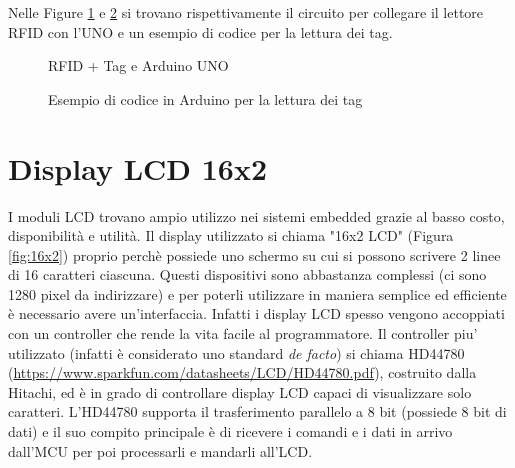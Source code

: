 \documentclass[12pt]{report}
\begin{document}
Nelle Figure \ref{fig:rfid_uno} e \ref{fig:rfid_code} si trovano rispettivamente il circuito per collegare il lettore RFID con l'UNO e un esempio di codice per la lettura dei tag.

\begin{figure}
	\caption{RFID + Tag e Arduino UNO}
	\label{fig:rfid_uno}
\end{figure}

\begin{figure}
	\caption{Esempio di codice in Arduino per la lettura dei tag}
	\label{fig:rfid_code}
\end{figure}

%
\section{Display LCD 16x2}
%

I moduli LCD trovano ampio utilizzo nei sistemi embedded grazie al basso costo, disponibilità e utilità. Il display utilizzato si chiama "16x2 LCD" (Figura \ref{fig:16x2}) proprio perchè possiede uno schermo su cui si possono scrivere 2 linee di 16 caratteri ciascuna. Questi dispositivi sono abbastanza complessi (ci sono 1280 pixel da indirizzare) e per poterli utilizzare in maniera semplice ed efficiente è necessario avere un'interfaccia. Infatti i display LCD spesso vengono accoppiati con un controller che rende la vita facile al programmatore. Il controller piu' utilizzato (infatti è considerato uno standard \textit{de facto}) si chiama HD44780 (\url{https://www.sparkfun.com/datasheets/LCD/HD44780.pdf}), costruito dalla Hitachi, ed è in grado di controllare display LCD capaci di visualizzare solo caratteri. L'HD44780 supporta il trasferimento parallelo a 8 bit (possiede 8 bit di dati) e il suo compito principale è di ricevere i comandi e i dati in arrivo dall'MCU per poi processarli
e mandarli all'LCD.
\end{document}
